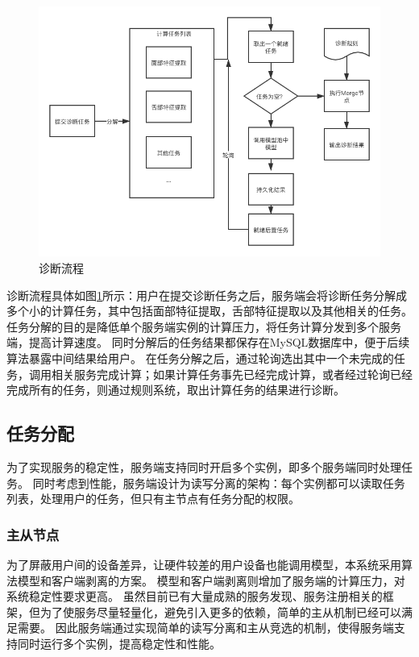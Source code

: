 \begin{figure}[ht]
    \centering
    \includegraphics[width=12cm]{images/sketch3.png}
    \caption{诊断流程}
    \label{fig:sketch}
\end{figure}

诊断流程具体如图\ref{fig:sketch}所示：用户在提交诊断任务之后，服务端会将诊断任务分解成多个小的计算任务，其中包括面部特征提取，舌部特征提取以及其他相关的任务。任务分解的目的是降低单个服务端实例的计算压力，将任务计算分发到多个服务端，提高计算速度。
同时分解后的任务结果都保存在MySQL数据库中，便于后续算法暴露中间结果给用户。
在任务分解之后，通过轮询选出其中一个未完成的任务，调用相关服务完成计算；如果计算任务事先已经完成计算，或者经过轮询已经完成所有的任务，则通过规则系统，取出计算任务的结果进行诊断。



\subsection{任务分配}
为了实现服务的稳定性，服务端支持同时开启多个实例，即多个服务端同时处理任务。
同时考虑到性能，服务端设计为读写分离的架构：每个实例都可以读取任务列表，处理用户的任务，但只有主节点有任务分配的权限。


\subsubsection{主从节点}
为了屏蔽用户间的设备差异，让硬件较差的用户设备也能调用模型，本系统采用算法模型和客户端剥离的方案。
模型和客户端剥离则增加了服务端的计算压力，对系统稳定性要求更高。
虽然目前已有大量成熟的服务发现、服务注册相关的框架，但为了使服务尽量轻量化，避免引入更多的依赖，简单的主从机制已经可以满足需要。
因此服务端通过实现简单的读写分离和主从竞选的机制，使得服务端支持同时运行多个实例，提高稳定性和性能。


